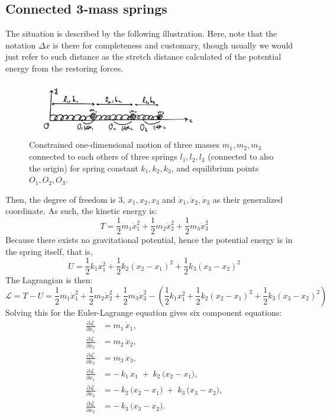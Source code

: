 \subsection{Connected 3-mass springs}
The situation is described by the following illustration. Here, note that the notation $\Delta x$ is there for completeness and customary, though usually we would just refer to such distance as the stretch distance calculated of the potential energy from the restoring forces. 
\begin{figure}[htb]
    \centering
    \includegraphics[width=0.7\textwidth]{img/peakspring.jpg}
    \caption{Constrained one-dimensional motion of three masses $m_{1},m_{2},m_{3}$ connected to each others of three springs $l_{1},l_{2},l_{3}$ (connected to also the origin) for spring constant $k_{1},k_{2},k_{3}$, and equilibrium points $O_{1},O_{2},O_{3}$.}
\end{figure}
Then, the degree of freedom is 3, $x_{1},x_{2},x_{3}$ and $\dot{x}_{1},\dot{x}_{2},\dot{x}_{3}$ as their generalized coordinate. As such, the kinetic energy is: 
\begin{equation}
        T 
        = \frac{1}{2}m_{1}\dot{x}_{1}^{2} + \frac{1}{2}m_{2}\dot{x}_{2}^{2}+\frac{1}{2}m_{3}\dot{x}_{3}^{2}
\end{equation}
Because there exists no gravitational potential, hence the potential energy is in the spring itself, that is, 
\begin{equation}
    U = \frac{1}{2}k_{1}x_{1}^{2} + \frac{1}{2} k_{2}(x_{2}-x_{1})^{2} + \frac{1}{2}k_{3} (x_{3}-x_{2})^{2}
\end{equation}
The Lagrangian is then:
\begin{equation}
    \mathcal{L} = T - U = \frac{1}{2}m_{1}\dot{x}_{1}^{2} + \frac{1}{2}m_{2}\dot{x}_{2}^{2}+\frac{1}{2}m_{3}\dot{x}_{3}^{2} - \left(\frac{1}{2}k_{1}x_{1}^{2} + \frac{1}{2} k_{2}(x_{2}-x_{1})^{2} + \frac{1}{2}k_{3} (x_{3}-x_{2})^{2}\right)
\end{equation}
Solving this for the Euler-Lagrange equation gives six component equations: 
\begin{align}
\frac{\partial \mathcal{L}}{\partial \dot{x}_{1}} 
&= m_{1}\,\dot{x}_{1}, \\[6pt]
\frac{\partial \mathcal{L}}{\partial \dot{x}_{2}} 
&= m_{2}\,\dot{x}_{2}, \\[6pt]
\frac{\partial \mathcal{L}}{\partial \dot{x}_{3}} 
&= m_{3}\,\dot{x}_{3}, \\[6pt]
\frac{\partial \mathcal{L}}{\partial x_{1}} 
&= -\,k_{1}\,x_{1} \;+\; k_{2}\,\bigl(x_{2}-x_{1}\bigr), \\[6pt]
\frac{\partial \mathcal{L}}{\partial x_{2}} 
&= -\,k_{2}\,\bigl(x_{2}-x_{1}\bigr) \;+\; k_{3}\,\bigl(x_{3}-x_{2}\bigr), \\[6pt]
\frac{\partial \mathcal{L}}{\partial x_{3}} 
&= -\,k_{3}\,\bigl(x_{3}-x_{2}\bigr).
\end{align}
